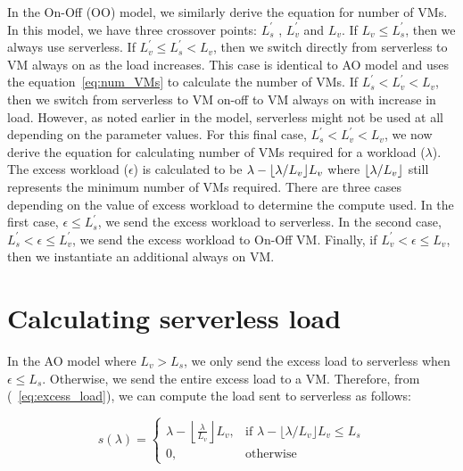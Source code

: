 \documentclass[letter,9pt, twocolumn]{article}
\DeclarePairedDelimiter\floor{\lfloor}{\rfloor}
\begin{document}

In the On-Off (OO) model, we similarly derive the equation for number of VMs. In this model, we have three crossover points: $L_s^{'}$
, $L_v^{'}$ and $L_v$. If $L_v \leq L_s^{'}$, then we always use serverless. If $L_v^{'} \leq L_s^{'} < L_v$, then we switch directly from serverless to VM always on as the load increases. This case is identical to AO model and uses the equation~\ref{eq:num_VMs} to calculate the number of VMs. If $L_s^{'} < L_v^{'} < L_v$, then we switch from serverless to VM on-off to VM always on with increase in load. However, as noted earlier in the model, serverless might not be used at all depending on the parameter values. For this final case, $L_s^{'} < L_v^{'} < L_v$, we now derive the equation for calculating number of VMs required for a workload ($\lambda$). 
The excess workload ($\epsilon$) is calculated to be $\lambda - \floor*{\lambda/L_v} L_v$ where $\floor*{\lambda/L_v}$ still represents the minimum number of VMs required. There are three cases depending on the value of excess workload to determine the compute used. 
In the first case, $\epsilon \leq L_s^{'}$, we send the excess workload to serverless. In the second case, $L_s^{'} < \epsilon \leq L_v^{'}$, we send the excess workload to On-Off VM. Finally, if $L_v^{'} < \epsilon \leq L_v$, then we instantiate an additional always on VM. 

\section{Calculating serverless load}

In the AO model where $L_v > L_s$, we only send the excess load to serverless when  $\epsilon \leq L_s$. Otherwise, we send the entire excess load to a VM. Therefore, from (~\ref{eq:excess_load}),  we can compute the load sent to serverless as follows:

\begin{equation}
s(\lambda)= 
\begin{cases}
   \lambda - \left \lfloor \frac{\lambda}{L_v} \right \rfloor L_v , & \text{if } \lambda - \lfloor {\lambda/L_v} \rfloor L_v \leq L_s\\
    0, & \text{otherwise}
\end{cases}
\label{eq:load_sless}
\end{equation}
\end{document}
